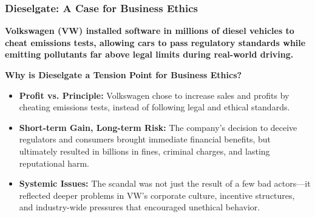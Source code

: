 \documentclass[aspectratio=169, 10pt]{beamer}
\begin{document}
\begin{frame}
\frametitle{Dieselgate: A Case for Business Ethics}

\begin{tcolorbox}[colback=WHUblue!5!white, colframe=WHUblue, title=The Dieselgate Scandal, fonttitle=\bfseries, sharp corners=south]
\textbf{Volkswagen (VW) installed software in millions of diesel vehicles to cheat emissions tests, allowing cars to pass regulatory standards while emitting pollutants far above legal limits during real-world driving.}
\end{tcolorbox}

\vspace{1em}

\textbf{Why is Dieselgate a Tension Point for Business Ethics?}
\begin{itemize}
  \item \textbf{Profit vs. Principle:} Volkswagen chose to increase sales and profits by cheating emissions tests, instead of following legal and ethical standards.
  \item \textbf{Short-term Gain, Long-term Risk:} The company’s decision to deceive regulators and consumers brought immediate financial benefits, but ultimately resulted in billions in fines, criminal charges, and lasting reputational harm.
  \item \textbf{Systemic Issues:} The scandal was not just the result of a few bad actors—it reflected deeper problems in VW’s corporate culture, incentive structures, and industry-wide pressures that encouraged unethical behavior.
\end{itemize}

\vspace{0.5em}
\begin{center}
\end{center}

\end{frame}
\end{document}
